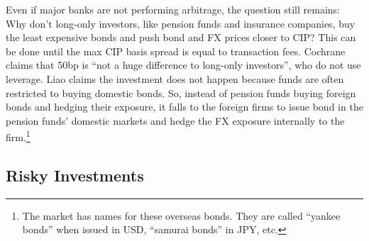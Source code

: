 
Even if major banks are not performing arbitrage, the question still remains: Why don't long-only investors, like pension funds and insurance companies, buy the least expensive bonds and push bond and FX prices closer to CIP?  This can be done until the max CIP basis spread is equal to transaction fees.  Cochrane claims that 50bp is ``not a huge difference to long-only investors''\cite{Cochrane2017}, who do not use leverage.  Liao claims the investment does not happen because funds are often restricted to buying domestic bonds.\cite{Liao2016}  So, instead of pension funds buying foreign bonds and hedging their exposure, it falls to the foreign firms to issue bond in the pension funds' domestic markets and hedge the FX exposure internally to the firm.\footnote{The market has names for these overseas bonds.  They are called ``yankee bonds'' when issued in USD, ``samurai bonds'' in JPY, etc.}










\subsection{Risky Investments}

